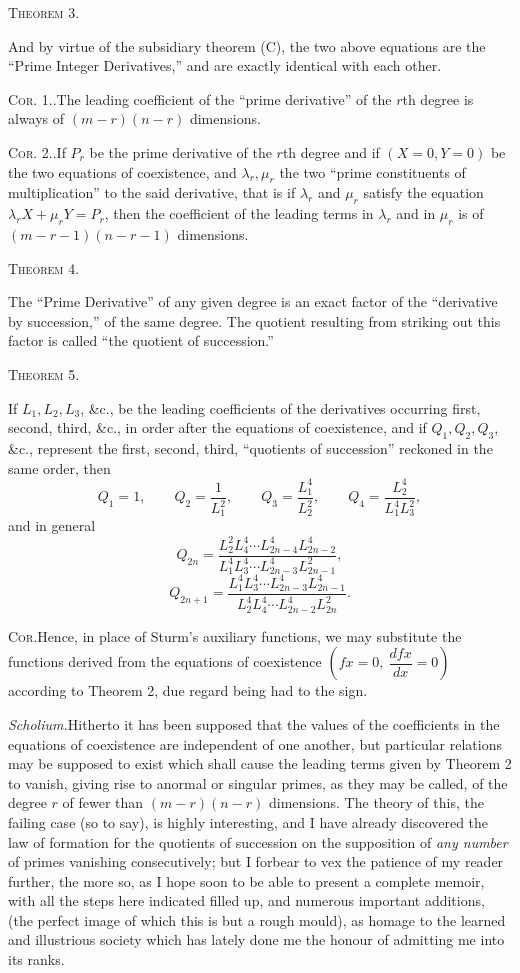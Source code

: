 \documentclass[11pt]{article}
\newcommand{\sourcepage}[1]{\marginpar{\scriptsize p.~#1}}
\newcommand{\theoremhead}[1]{\vspace{0.75em}\begin{center}{\scshape Theorem #1.}\end{center}\vspace{0.15em}}
\newcommand{\corhead}[1]{\textsc{Cor. #1.}}
\begin{document}
\theoremhead{3}

And by virtue of the subsidiary theorem (C), the two above equations are the ``Prime Integer Derivatives,'' and are exactly identical with each other.

\corhead{1.}\quad The leading coefficient of the ``prime derivative'' of the $r$th degree is always of $(m-r)(n-r)$ dimensions.

\corhead{2.}\quad If $P_r$ be the prime derivative of the $r$th degree and if $(X=0,Y=0)$ be the two equations of coexistence, and $\lambda_r,\mu_r$ the two ``prime constituents of multiplication'' to the said derivative, that is if $\lambda_r$ and $\mu_r$ satisfy the equation $\lambda_rX+\mu_rY=P_r$, then the coefficient of the leading terms in $\lambda_r$ and in $\mu_r$ is of $(m-r-1)(n-r-1)$ dimensions.

\theoremhead{4}

The ``Prime Derivative'' of any given degree is an exact factor of the ``derivative by succession,'' of the same degree. The quotient resulting from striking out this factor is called ``the quotient of succession.''

\theoremhead{5}

If $L_1,L_2,L_3$, \&c., be the leading coefficients of the derivatives occurring first, second, third, \&c., in order after the equations of coexistence, and if $Q_1,Q_2,Q_3$, \&c., represent the first, second, third, ``quotients of succession'' reckoned in the same order, then
\[
 Q_1=1,
\qquad
 Q_2=\frac{1}{L_1^2},
\qquad
 Q_3=\frac{L_1^4}{L_2^2},
\qquad
 Q_4=\frac{L_2^4}{L_1^4L_3^2},
\]
\sourcepage{44}
and in general
\[
 Q_{2n}=\frac{L_2^2L_4^4\cdots L_{2n-4}^4L_{2n-2}^4}{L_1^4L_3^4\cdots L_{2n-3}^4L_{2n-1}^2},
\]
\[
 Q_{2n+1}=\frac{L_1^4L_3^4\cdots L_{2n-3}^4L_{2n-1}^4}{L_2^4L_4^4\cdots L_{2n-2}^4L_{2n}^2}.
\]

\textsc{Cor.}\quad Hence, in place of Sturm's auxiliary functions, we may substitute the functions derived from the equations of coexistence \(\left(fx=0,\ \dfrac{dfx}{dx}=0\right)\) according to Theorem 2, due regard being had to the sign.

\emph{Scholium.}\quad Hitherto it has been supposed that the values of the coefficients in the equations of coexistence are independent of one another, but particular relations may be supposed to exist which shall cause the leading terms given by Theorem 2 to vanish, giving rise to anormal or singular primes, as they may be called, of the degree $r$ of fewer than $(m-r)(n-r)$ dimensions. The theory of this, the failing case (so to say), is highly interesting, and I have already discovered the law of formation for the quotients of succession on the supposition of \emph{any number} of primes vanishing consecutively; but I forbear to vex the patience of my reader further, the more so, as I hope soon to be able to present a complete memoir, with all the steps here indicated filled up, and numerous important additions, (the perfect image of which this is but a rough mould), as homage to the learned and illustrious society which has lately done me the honour of admitting me into its ranks.
\end{document}
